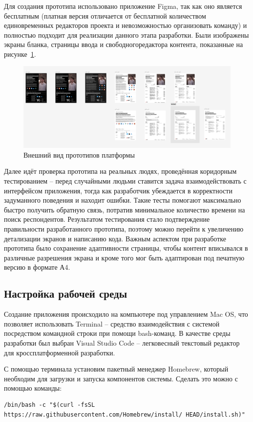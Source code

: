 \documentclass[master, och, diploma]{SCWorks}
\begin{document}
Для создания прототипа использовано приложение Figma, так как оно является бесплатным (платная версия отличается от бесплатной количеством единовременных редакторов проекта и невозможностью организовать команду) и полностью подходит для реализации данного этапа разработки. Были изображены экраны бланка, страницы ввода и свободногоредактора контента, показанные на рисунке~\ref{fig:21}.

\begin{figure}[!ht]
    \centering
    \includegraphics[width=12cm]{images/image21.png}
    \caption{\label{fig:21}%
        Внешний вид прототипов платформы}
\end{figure}

Далее идёт проверка прототипа на реальных людях, проведённая коридорным тестированием – перед случайными людьми ставится задача взаимодействовать с интерфейсом приложения, тогда как разработчик убеждается в корректности задуманного поведения и находит ошибки. Такие тесты помогают максимально быстро получить обратную связь, потратив минимальное количество времени на поиск респондентов. Результатом тестирования стало подтверждение правильности разработанного прототипа, поэтому можно перейти к увеличению детализации экранов и написанию кода. Важным аспектом при разработке прототипа было сохранение адаптивности страницы, чтобы контент вписывался в различные разрешения экрана и кроме того мог быть адаптирован под печатную версию в формате А4.


\subsection{Настройка рабочей среды}
Создание приложения происходило на компьютере под управлением Mac OS, что позволяет использовать Terminal – средство взаимодействия с системой посредством командной строки при помощи bash-команд. В качестве среды разработки был выбран Visual Studio Code – легковесный текстовый редактор для кроссплатформенной разработки.

С помощью терминала установим пакетный менеджер Homebrew, который необходим для загрузки и запуска компонентов системы. Сделать это можно с помощью команды:
\begin{verbatim}
/bin/bash -c "$(curl -fsSL https://raw.githubusercontent.com/Homebrew/install/ HEAD/install.sh)"
\end{verbatim}
\end{document}
